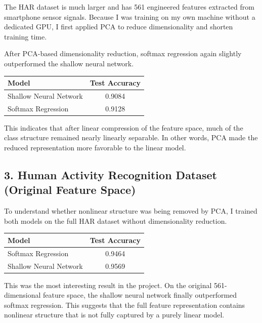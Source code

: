 \documentclass[11pt]{article}
\begin{document}
The HAR dataset is much larger and has 561 engineered features extracted from smartphone sensor signals. Because I was training on my own machine without a dedicated GPU, I first applied PCA to reduce dimensionality and shorten training time.

After PCA-based dimensionality reduction, softmax regression again slightly outperformed the shallow neural network.

\begin{center}
\begin{tabular}{>{\raggedright\arraybackslash}p{4.2cm}c}
\toprule
\textbf{Model} & \textbf{Test Accuracy} \\
\midrule
Shallow Neural Network & 0.9084 \\
Softmax Regression & 0.9128 \\
\bottomrule
\end{tabular}
\end{center}

This indicates that after linear compression of the feature space, much of the class structure remained nearly linearly separable. In other words, PCA made the reduced representation more favorable to the linear model.

\subsection*{3. Human Activity Recognition Dataset (Original Feature Space)}

To understand whether nonlinear structure was being removed by PCA, I trained both models on the full HAR dataset without dimensionality reduction.

\begin{center}
\begin{tabular}{>{\raggedright\arraybackslash}p{4.2cm}c}
\toprule
\textbf{Model} & \textbf{Test Accuracy} \\
\midrule
Softmax Regression & 0.9464 \\
Shallow Neural Network & 0.9569 \\
\bottomrule
\end{tabular}
\end{center}

This was the most interesting result in the project. On the original 561-dimensional feature space, the shallow neural network finally outperformed softmax regression. This suggests that the full feature representation contains nonlinear structure that is not fully captured by a purely linear model.
\end{document}
